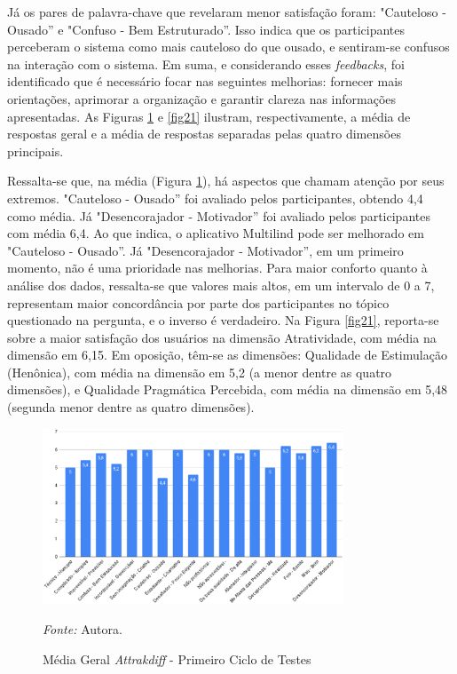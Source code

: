 Já os pares de palavra-chave que revelaram menor satisfação foram: "Cauteloso - Ousado'' e "Confuso - Bem Estruturado''. Isso indica que os participantes perceberam o sistema como mais cauteloso do que ousado, e 
sentiram-se confusos na interação com o sistema. Em suma, e considerando esses \textit{feedbacks}, foi identificado que é necessário focar nas seguintes melhorias: fornecer mais orientações, aprimorar a 
organização e garantir clareza nas informações apresentadas. As Figuras \ref{fig20} e \ref{fig21} ilustram, respectivamente, a média de respostas geral e a média de respostas separadas pelas quatro dimensões principais. 

Ressalta-se que, na média (Figura \ref{fig20}), há aspectos que chamam atenção por seus extremos. "Cauteloso - Ousado'' foi avaliado pelos participantes, obtendo 4,4 como média. Já "Desencorajador - Motivador'' foi avaliado pelos 
participantes com média 6,4. Ao que indica, o aplicativo Multilind pode ser melhorado em "Cauteloso - Ousado''. Já "Desencorajador - Motivador'', em um primeiro momento, não é uma prioridade nas melhorias. Para maior conforto 
quanto à análise dos dados, ressalta-se que valores mais altos, em um intervalo de 0 a 7, representam maior concordância por parte dos participantes no tópico questionado na pergunta, e o inverso é verdadeiro. Na Figura \ref{fig21}, 
reporta-se sobre a maior satisfação dos usuários na dimensão Atratividade, com média na dimensão em 6,15. Em oposição, têm-se as dimensões: Qualidade de Estimulação (Henônica), com média na dimensão em 5,2 (a menor dentre 
as quatro dimensões), e Qualidade Pragmática Percebida, com média na dimensão em 5,48 (segunda menor dentre as quatro dimensões).

\begin{figure}[h!]
	\centering
	\caption{Média Geral \textit{Attrakdiff} - Primeiro Ciclo de Testes}
	\begin{adjustbox}{center}
		\includegraphics[width=0.8\textwidth]{figuras/media-geral.eps}
	\end{adjustbox}
	\begin{tablenotes}[flushleft]
		\centering
		\item \textit{Fonte:} Autora.
	\end{tablenotes}
	\label{fig20}
\end{figure}


